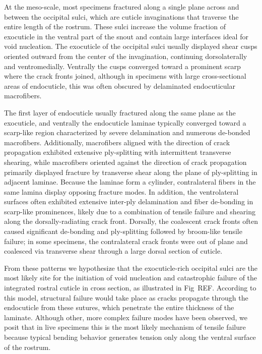 \documentclass[twocolumn, linenumbers, superscriptaddress, nofootinbib]{revtex4-1}
\begin{document}
		At the meso-scale, most specimens fractured along a single plane across and between the occipital sulci, which are cuticle invaginations that traverse the entire length of the rostrum.
		These sulci increase the volume fraction of exocuticle in the ventral part of the snout and contain large interfaces ideal for void nucleation.
		The exocuticle of the occipital sulci usually displayed shear cusps oriented outward from the center of the invagination, continuing dorsolaterally and ventromedially.
		Ventrally the cusps converged toward a prominent scarp where the crack fronts joined, although in specimens with large cross-sectional areas of endocuticle, this was often obscured by delaminated endocuticular macrofibers.
		
		The first layer of endocuticle usually fractured along the same plane as the exocuticle, and ventrally the endocuticle laminae typically converged toward a scarp-like region characterized by severe delamination and numerous de-bonded macrofibers.
		Additionally, macrofibers aligned with the direction of crack propagation exhibited extensive ply-splitting with intermittent transverse shearing, while macrofibers oriented against the direction of crack propagation primarily displayed fracture by transverse shear along the plane of ply-splitting in adjacent laminae.
		Because the laminae form a cylinder, contralateral fibers in the same lamina display opposing fracture modes.
		In addition, the ventrolateral surfaces often exhibited extensive inter-ply delamination and fiber de-bonding in scarp-like prominences, likely due to a combination of tensile failure and shearing along the dorsally-radiating crack front.
		Dorsally, the coalescent crack fronts often caused significant de-bonding and ply-splitting followed by broom-like tensile failure; in some specimens, the contralateral crack fronts were out of plane and coalesced via transverse shear through a large dorsal section of cuticle.
		
		From these patterns we hypothesize that the exocuticle-rich occipital sulci are the most likely site for the initiation of void nucleation and catastrophic failure of the integrated rostral cuticle in cross section, as illustrated in Fig~REF.
		According to this model, structural failure would take place as cracks propagate through the endocuticle from these sutures, which penetrate the entire thickness of the laminate.
		Although other, more complex failure modes have been observed, we posit that in live specimens this is the most likely mechanism of tensile failure because typical bending behavior generates tension only along the ventral surface of the rostrum.
\end{document}
